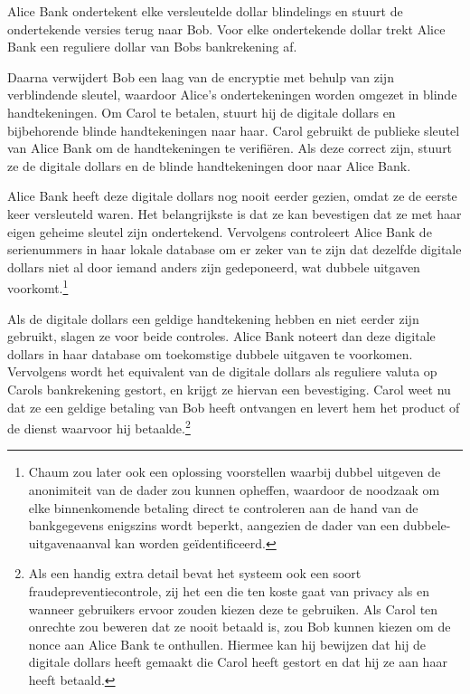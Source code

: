 \documentclass[
  a5paper,
  smalldemyvopaper,11pt,twoside,onecolumn,openright,extrafontsizes,
hidelinks]{memoir}
\begin{document}
Alice Bank ondertekent elke versleutelde dollar blindelings en stuurt de
ondertekende versies terug naar Bob. Voor elke ondertekende dollar trekt
Alice Bank een reguliere dollar van Bobs bankrekening af.

Daarna verwijdert Bob een laag van de encryptie met behulp van zijn
verblindende sleutel, waardoor Alice's ondertekeningen worden omgezet in
blinde handtekeningen. Om Carol te betalen, stuurt hij de digitale
dollars en bijbehorende blinde handtekeningen naar haar. Carol gebruikt
de publieke sleutel van Alice Bank om de handtekeningen te verifiëren.
Als deze correct zijn, stuurt ze de digitale dollars en de blinde
handtekeningen door naar Alice Bank.

Alice Bank heeft deze digitale dollars nog nooit eerder gezien, omdat ze
de eerste keer versleuteld waren. Het belangrijkste is dat ze kan
bevestigen dat ze met haar eigen geheime sleutel zijn ondertekend.
Vervolgens controleert Alice Bank de serienummers in haar lokale
database om er zeker van te zijn dat dezelfde digitale dollars niet al
door iemand anders zijn gedeponeerd, wat dubbele uitgaven
voorkomt.\footnote{Chaum zou later ook een oplossing voorstellen waarbij
  dubbel uitgeven de anonimiteit van de dader zou kunnen opheffen,
  waardoor de noodzaak om elke binnenkomende betaling direct te
  controleren aan de hand van de bankgegevens enigszins wordt beperkt,
  aangezien de dader van een dubbele-uitgavenaanval kan worden
  geïdentificeerd.}

Als de digitale dollars een geldige handtekening hebben en niet eerder
zijn gebruikt, slagen ze voor beide controles. Alice Bank noteert dan
deze digitale dollars in haar database om toekomstige dubbele uitgaven
te voorkomen. Vervolgens wordt het equivalent van de digitale dollars
als reguliere valuta op Carols bankrekening gestort, en krijgt ze
hiervan een bevestiging. Carol weet nu dat ze een geldige betaling van
Bob heeft ontvangen en levert hem het product of de dienst waarvoor hij
betaalde.\footnote{Als een handig extra detail bevat het systeem ook een
  soort fraudepreventiecontrole, zij het een die ten koste gaat van
  privacy als en wanneer gebruikers ervoor zouden kiezen deze te
  gebruiken. Als Carol ten onrechte zou beweren dat ze nooit betaald is,
  zou Bob kunnen kiezen om de nonce aan Alice Bank te onthullen. Hiermee
  kan hij bewijzen dat hij de digitale dollars heeft gemaakt die Carol
  heeft gestort en dat hij ze aan haar heeft betaald.}
\end{document}
